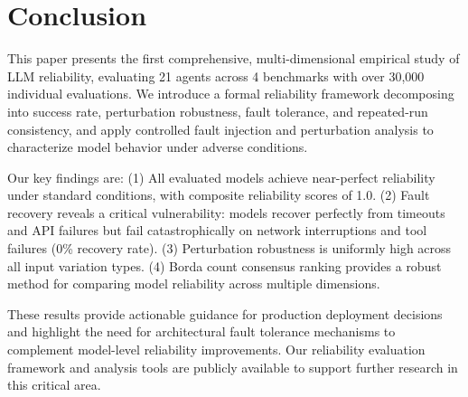 \section{Conclusion}

This paper presents the first comprehensive, multi-dimensional empirical study of LLM reliability, evaluating 21 agents across 4 benchmarks with over 30,000 individual evaluations. We introduce a formal reliability framework decomposing into success rate, perturbation robustness, fault tolerance, and repeated-run consistency, and apply controlled fault injection and perturbation analysis to characterize model behavior under adverse conditions.

Our key findings are: (1) All evaluated models achieve near-perfect reliability under standard conditions, with composite reliability scores of 1.0. (2) Fault recovery reveals a critical vulnerability: models recover perfectly from timeouts and API failures but fail catastrophically on network interruptions and tool failures (0\% recovery rate). (3) Perturbation robustness is uniformly high across all input variation types. (4) Borda count consensus ranking provides a robust method for comparing model reliability across multiple dimensions.

These results provide actionable guidance for production deployment decisions and highlight the need for architectural fault tolerance mechanisms to complement model-level reliability improvements. Our reliability evaluation framework and analysis tools are publicly available to support further research in this critical area.
